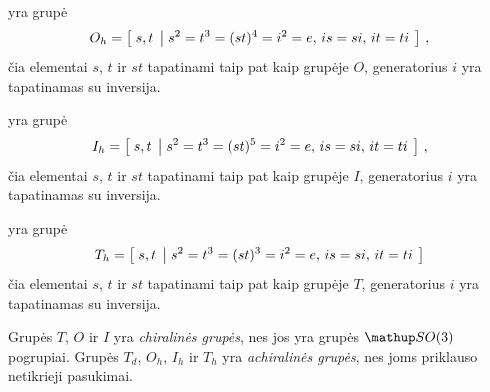 \begin{definition}
	 yra grupė 
	\begin{equation}
		O_h = \left[\; s,t \;\left|\; 
			s^2=t^3=(st)^4=i^2=e,\,
			is=si ,\,
			it=ti  \;\right.\right]
		\,,
	\end{equation}
	čia elementai $s$, $t$ ir $st$ tapatinami taip pat kaip grupėje $O$,
	generatorius $i$ yra tapatinamas su inversija.
\end{definition}

\begin{definition}
	 yra grupė 
	\begin{equation}
		I_h = \left[\; s,t \;\left|\; 
			s^2=t^3=(st)^5=i^2=e,\,
			is=si ,\,
			it=ti  \;\right.\right]
		\,,
	\end{equation}
	čia elementai $s$, $t$ ir $st$ tapatinami taip pat kaip grupėje $I$,
	generatorius $i$ yra tapatinamas su inversija.
\end{definition}

\begin{definition}
	 yra grupė
	\begin{equation}
		T_h = \left[\; s,t \;\left|\; 
			s^2=t^3=(st)^3=i^2=e,\,
			is=si ,\,
			it=ti  \;\right.\right]
	\end{equation}
	čia elementai $s$, $t$ ir $st$ tapatinami taip pat kaip grupėje $T$,
	generatorius $i$ yra tapatinamas su inversija.
\end{definition} 

Grupės $T$, $O$ ir $I$ yra \emph{chiralinės grupės},
nes jos yra grupės $\SO3$ pogrupiai.
Grupės $T_d$, $O_h$, $I_h$ ir $T_h$ yra \emph{achiralinės grupės},
nes joms priklauso netikrieji pasukimai.

